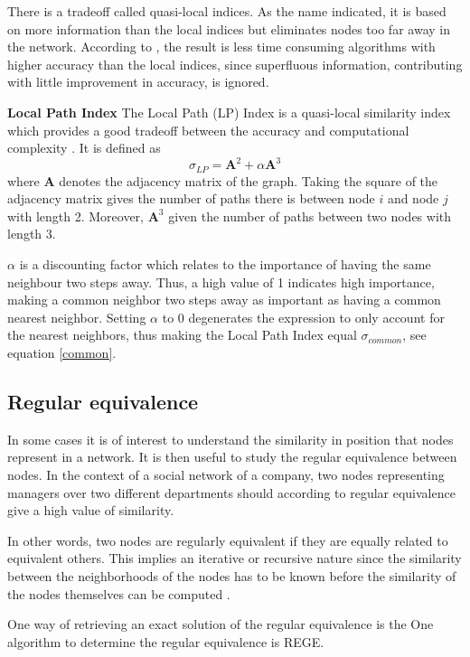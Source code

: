 There is a tradeoff called quasi-local indices. As the name indicated, it is based on more information than the local indices but eliminates nodes too far away in the network. According to \citet{lu2011}, the result is less time consuming algorithms with higher accuracy than the local indices, since superfluous information, contributing with little improvement in accuracy, is ignored.

\textbf{Local Path Index} The Local Path (LP) Index is a quasi-local similarity index which provides a good tradeoff between the accuracy and computational complexity \citep{lu2011}. It is defined as 
\begin{equation}
    \label{lp}
    \sigma_{LP} = \textbf{A}^2+\alpha \textbf{A}^3
\end{equation}
where $\textbf{A}$ denotes the adjacency matrix of the graph. Taking the square of the adjacency matrix gives the number of paths there is between node $i$ and node $j$ with length 2. Moreover, $\textbf{A}^3$ given the number of paths between two nodes with length 3. 

$\alpha$ is a discounting factor which relates to the importance of having the same neighbour two steps away. Thus, a high value of 1 indicates high importance, making a common neighbor two steps away as important as having a common nearest neighbor. Setting $\alpha$ to 0 degenerates the expression to only account for the nearest neighbors, thus making the Local Path Index equal $\sigma_{common}$, see equation \eqref{common}.



\subsection{Regular equivalence}
In some cases it is of interest to understand the similarity in position that nodes represent in a network.  It is then useful to study the regular equivalence between nodes. In the context of a social network of a company, two nodes representing managers over two different departments should according to regular equivalence give a high value of similarity. 

In other words, two nodes are regularly equivalent if they are equally related to equivalent others. This implies an iterative or recursive nature since the similarity between the neighborhoods of the nodes has to be known before the similarity of the nodes themselves can be computed \cite{leicht2006}. 

One way of retrieving an exact solution of the regular equivalence is the 
One algorithm to determine the regular equivalence is REGE. 

